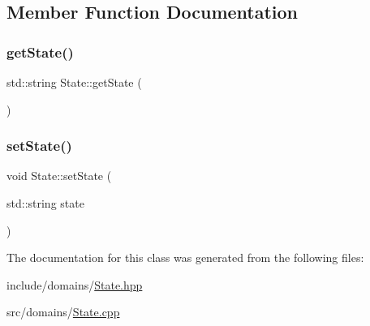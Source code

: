 \subsection{Member Function Documentation}
\mbox{\label{class_state_ad8697cb367f8b1453a1412426fc248ae}} 
\subsubsection{\texorpdfstring{getState()}{getState()}}
{\footnotesize\ttfamily std\+::string State\+::get\+State (\begin{DoxyParamCaption}{ }\end{DoxyParamCaption})}

\mbox{\label{class_state_ad267a860927ae9032e808d06d5fc9d30}} 
\subsubsection{\texorpdfstring{setState()}{setState()}}
{\footnotesize\ttfamily void State\+::set\+State (\begin{DoxyParamCaption}\item[{std\+::string}]{state }\end{DoxyParamCaption})}



The documentation for this class was generated from the following files\+:\begin{DoxyCompactItemize}
\item 
include/domains/\mbox{\hyperlink{_state_8hpp}{State.\+hpp}}\item 
src/domains/\mbox{\hyperlink{_state_8cpp}{State.\+cpp}}\end{DoxyCompactItemize}
